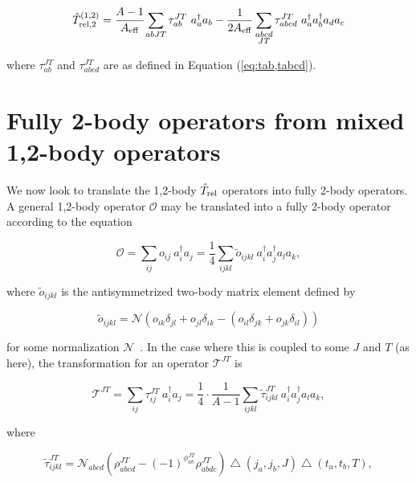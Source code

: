 \documentclass{article}
\def\aeff{A_{\rm{eff}}}
\def\trelop{\hat{T}_{\rm{rel}}}
\def\trelopi_#1^#2{\hat{T}_{\rm{rel}, #1}^{#2}}
\def\creop{a^{\dagger}}
\def\annop{a}
\begin{document}
\begin{equation}\label{eq:trel2op1,2}
  \trelopi_2^{(1,2)} = \cfrac{A-1}{\aeff}
  \displaystyle\sum_{abJT}\tau_{ab}^{JT}~\creop_a\annop_b
  -\frac{1}{2\aeff} \displaystyle\sum_{\substack{abcd\\JT}}
  \tau_{abcd}^{JT}~\creop_a\creop_b\annop_d\annop_c
\end{equation}

where $\tau_{ab}^{JT}$ and $\tau_{abcd}^{JT}$ are as defined in Equation
(\ref{eq:tab,tabcd}).


\section{Fully 2-body operators from mixed 1,2-body operators}
We now look to translate the 1,2-body $\trelop$ operators into fully 2-body
operators. A general 1,2-body operator $\mathcal{O}$ may be translated into
a fully 2-body operator according to the equation

\begin{equation*}
  \mathcal{O} = \displaystyle\sum_{ij}o_{ij}~\creop_i\annop_j =
  \frac{1}{4}\displaystyle\sum_{ijkl}\tilde{o}_{ijkl}
  ~\creop_i\creop_j\annop_l\annop_k,
\end{equation*}

where $\tilde{o}_{ijkl}$ is the antisymmetrized two-body matrix element
defined by

\begin{equation*}
  \tilde{o}_{ijkl} = \mathcal{N}\left(
  o_{ik}\delta_{jl} + o_{jl}\delta_{ik} -
  \left( o_{il}\delta_{jk} + o_{jk}\delta_{il} \right)
  \right)
\end{equation*}

for some normalization $\mathcal{N}$~\cite{promoting1to2}.
In the case where this is coupled to some $J$ and $T$ (as here), the
transformation for an operator $\mathcal{T}^{JT}$ is

\begin{equation}\label{eq:12to2}
  \mathcal{T}^{JT} = \displaystyle\sum_{ij}\tau_{ij}^{JT}~\creop_i\annop_j =
  \frac{1}{4}\cdot\frac{1}{A-1}\displaystyle\sum_{ijkl}\tilde{\tau}_{ijkl}^{JT}
  ~\creop_i\creop_j\annop_l\annop_k,
\end{equation}

where

\begin{equation}\label{eq:12to2op}
  \tilde{\tau}_{ijkl}^{JT} = \mathcal{N}_{abcd} \left(
  \rho_{abcd}^{JT} - {(-1)}^{\phi_{ab}^{JT}}\rho_{abdc}^{JT}
  \right)
  \bigtriangleup\left(j_a, j_b, J\right)
  \bigtriangleup\left(t_a, t_b, T\right),
\end{equation}
\end{document}
